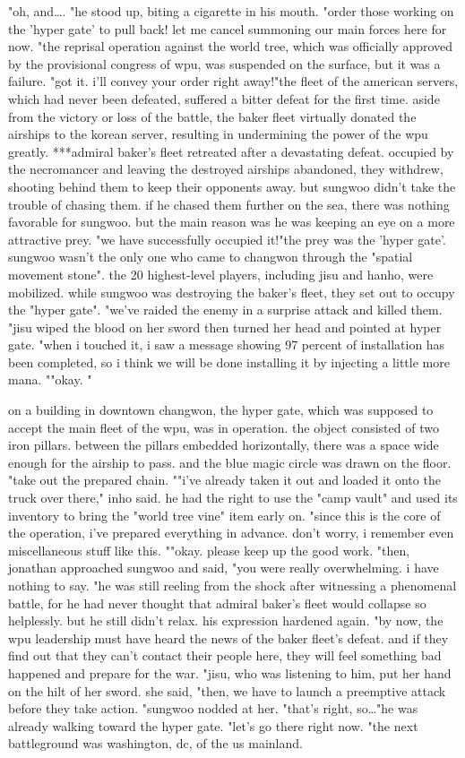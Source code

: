 "oh, and….
"he stood up, biting a cigarette in his mouth.
"order those working on the 'hyper gate' to pull back! let me cancel summoning our main forces here for now.
"the reprisal operation against the world tree, which was officially approved by the provisional congress of wpu, was suspended on the surface, but it was a failure.
"got it.
 i'll convey your order right away!"the fleet of the american servers, which had never been defeated, suffered a bitter defeat for the first time.
aside from the victory or loss of the battle, the baker fleet virtually donated the airships to the korean server, resulting in undermining the power of the wpu greatly.
***admiral baker's fleet retreated after a devastating defeat.
 occupied by the necromancer and leaving the destroyed airships abandoned, they withdrew, shooting behind them to keep their opponents away.
but sungwoo didn't take the trouble of chasing them.
 if he chased them further on the sea, there was nothing favorable for sungwoo.
but the main reason was he was keeping an eye on a more attractive prey.
"we have successfully occupied it!"the prey was the 'hyper gate'.
sungwoo wasn't the only one who came to changwon through the "spatial movement stone".
 the 20 highest-level players, including jisu and hanho, were mobilized.
while sungwoo was destroying the baker's fleet, they set out to occupy the "hyper gate".
"we've raided the enemy in a surprise attack and killed them.
"jisu wiped the blood on her sword then turned her head and pointed at hyper gate.
"when i touched it, i saw a message showing 97 percent of installation has been completed, so i think we will be done installing it by injecting a little more mana.
""okay.
"

on a building in downtown changwon, the hyper gate, which was supposed to accept the main fleet of the wpu, was in operation.
the object consisted of two iron pillars.
 between the pillars embedded horizontally, there was a space wide enough for the airship to pass.
 and the blue magic circle was drawn on the floor.
"take out the prepared chain.
""i've already taken it out and loaded it onto the truck over there," inho said.
he had the right to use the "camp vault" and used its inventory to bring the "world tree vine" item early on.
"since this is the core of the operation, i've prepared everything in advance.
 don't worry, i remember even miscellaneous stuff like this.
""okay.
 please keep up the good work.
"then, jonathan approached sungwoo and said, "you were really overwhelming.
 i have nothing to say.
"he was still reeling from the shock after witnessing a phenomenal battle, for he had never thought that admiral baker's fleet would collapse so helplessly.
but he still didn't relax.
 his expression hardened again.
"by now, the wpu leadership must have heard the news of the baker fleet's defeat.
 and if they find out that they can't contact their people here, they will feel something bad happened and prepare for the war.
"jisu, who was listening to him, put her hand on the hilt of her sword.
 she said, "then, we have to launch a preemptive attack before they take action.
"sungwoo nodded at her.
"that's right, so…"he was already walking toward the hyper gate.
 "let's go there right now.
"the next battleground was washington, dc, of the us mainland.


 